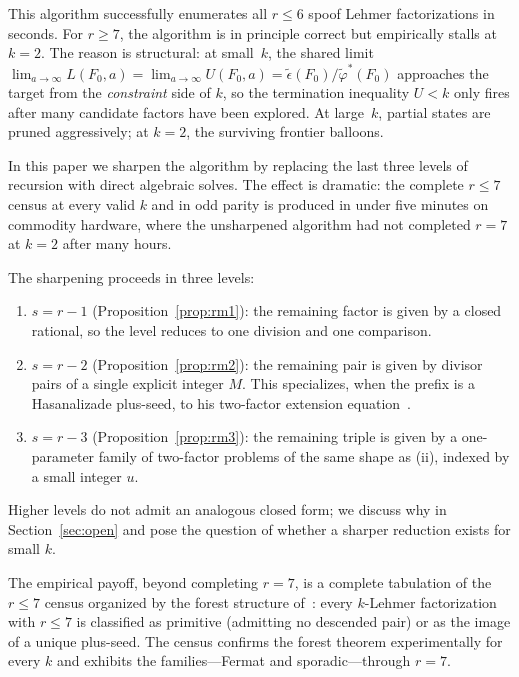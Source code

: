 \documentclass[11pt]{article}
\theoremstyle{definition}
\theoremstyle{remark}
\newcommand{\eps}{\tilde{\epsilon}}
\newcommand{\phist}{\tilde{\varphi}^*}
\begin{document}
This algorithm successfully enumerates all $r \le 6$ spoof Lehmer
factorizations in seconds.  For $r \ge 7$, the algorithm is in
principle correct but empirically stalls at $k = 2$.  The reason is
structural: at small~$k$, the shared limit $\lim_{a \to \infty}
L(F_0, a) = \lim_{a \to \infty} U(F_0, a) = \eps(F_0)/\phist(F_0)$
approaches the target from the \emph{constraint} side of $k$, so the
termination inequality $U < k$ only fires after many candidate factors
have been explored.  At large~$k$, partial states are pruned
aggressively; at $k = 2$, the surviving frontier balloons.

In this paper we sharpen the algorithm by replacing the last three
levels of recursion with direct algebraic solves. The effect is
dramatic: the complete $r \le 7$ census at every valid $k$ and in odd
parity is produced in under five minutes on commodity hardware, where
the unsharpened algorithm had not completed $r = 7$ at $k = 2$ after
many hours.

The sharpening proceeds in three levels:

\begin{enumerate}[label=(\roman*)]
  \item \textbf{$s = r - 1$} (Proposition~\ref{prop:rm1}): the
    remaining factor is given by a closed rational, so the level
    reduces to one division and one comparison.
  \item \textbf{$s = r - 2$} (Proposition~\ref{prop:rm2}): the
    remaining pair is given by divisor pairs of a single explicit
    integer $M$. This specializes, when the prefix is a
    Hasanalizade plus-seed, to his two-factor extension
    equation~\cite{H26}.
  \item \textbf{$s = r - 3$} (Proposition~\ref{prop:rm3}): the
    remaining triple is given by a one-parameter family of
    two-factor problems of the same shape as (ii), indexed by a
    small integer $u$.
\end{enumerate}

Higher levels do not admit an analogous closed form; we discuss why
in Section~\ref{sec:open} and pose the question of whether a sharper
reduction exists for small $k$.

The empirical payoff, beyond completing $r = 7$, is a complete
tabulation of the $r \le 7$ census organized by the forest structure
of~\cite{MFT}: every $k$-Lehmer factorization with $r \le 7$ is
classified as primitive (admitting no descended pair) or as the
image of a unique plus-seed. The census confirms the forest theorem
experimentally for every $k$ and exhibits the families---Fermat and
sporadic---through $r = 7$.
\end{document}

